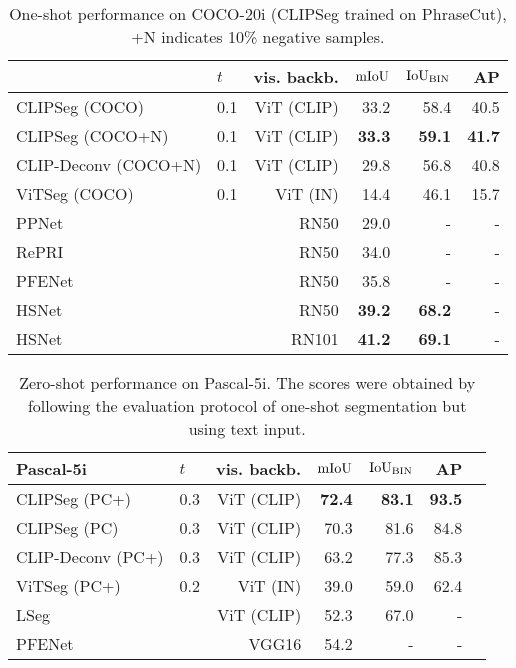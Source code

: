 \documentclass[10pt,twocolumn,letterpaper]{article}
\begin{document}
\begin{table}[t]
    \centering
    \footnotesize
    \setlength{\tabcolsep}{1.7mm}
    \begin{tabular}{llrrrr}
        \midrule
        & $t$ & vis. backb. & $\text{mIoU}$ & $\text{IoU}_{\text{BIN}}$ &  AP  \\
        \midrule
CLIPSeg (COCO) & 0.1 & ViT (CLIP) &  33.2 & 58.4 & 40.5 \\
CLIPSeg (COCO+N)  & 0.1 & ViT (CLIP) &  \textbf{33.3} & \textbf{59.1} & \textbf{41.7} \\
CLIP-Deconv (COCO+N)  & 0.1 & ViT (CLIP) &  29.8 & 56.8 & 40.8 \\
ViTSeg (COCO)  & 0.1 & ViT (IN) &  14.4 & 46.1 & 15.7 \\
        \midrule
        PPNet \cite{liu20} & & RN50 & 29.0  & - & -  \\
        RePRI \cite{boudiaf20} & & RN50  & 34.0  & - & - \\
        PFENet \cite{tian20a} & & RN50 & 35.8 & - & - \\
        HSNet \cite{min21hsnet} & & RN50 & \textbf{39.2} & \textbf{68.2} & - \\
        \midrule
        HSNet \cite{min21hsnet} & & RN101 & \textbf{41.2} & \textbf{69.1} & - \\
        \bottomrule
    \end{tabular} \caption{One-shot performance on COCO-20i (CLIPSeg trained on PhraseCut), +N indicates 10\% negative samples.}
    \label{tab:coco20i_oneshot}
\end{table}

\begin{table}[t]
    \centering
    \footnotesize
    \setlength{\tabcolsep}{1mm}
    \begin{tabular}{llrrrrr}
         \toprule 
        \textbf{Pascal-5i} & $t$ & vis. backb. & $\text{mIoU}$ & $\text{IoU}_{\text{BIN}}$ &  AP \\
        \midrule
CLIPSeg (PC+) & 0.3 & ViT (CLIP) & \textbf{72.4} & \textbf{83.1} & \textbf{93.5} \\
CLIPSeg (PC) & 0.3 & ViT (CLIP) & 70.3 & 81.6 & 84.8 \\
CLIP-Deconv (PC+) & 0.3 & ViT (CLIP) & 63.2 & 77.3 & 85.3 \\
ViTSeg (PC+) & 0.2 & ViT (IN) & 39.0 & 59.0 & 62.4 \\
        \midrule
        LSeg  \cite{li2022languagedriven} & & ViT (CLIP) & 52.3 & 67.0 & -  \\
        PFENet \cite{tian20a} & & VGG16 & 54.2 & - & - \\
        \bottomrule
    \end{tabular}\caption{Zero-shot performance on Pascal-5i. The scores were obtained by following the evaluation protocol of one-shot segmentation but using text input.}
    \label{tab:pas5i_zeroshot}
\end{table}
\end{document}
